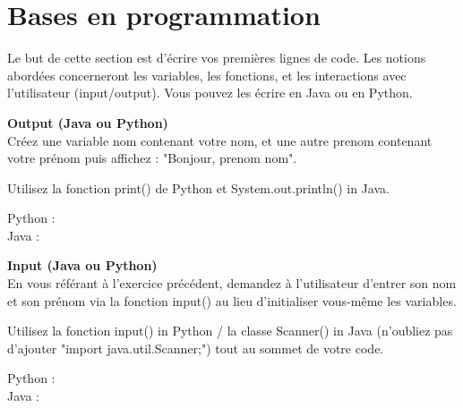 \newpage
\section{Bases en programmation}
Le but de cette section est d'écrire vos premières lignes de code. Les notions abordées concerneront les variables, les fonctions, et les interactions avec l'utilisateur (input/output). Vous pouvez les écrire en Java ou en Python.\\

\begin{Exercice}[20 minutes] \textbf{Output (Java ou Python)}\\
   Créez une variable nom contenant votre nom, et une autre prenom contenant votre prénom puis affichez : "Bonjour, prenom nom". \\
   
    \begin{conseil}
        Utilisez la fonction print() de Python et System.out.println() in Java. 
        
    \end{conseil}
    \begin{solution}
    
    Python : \\
    
    
    
    Java : \\
    
      
       
        
    \end{solution}   
\end{Exercice}

\begin{Exercice}[20 minutes] \textbf{Input (Java ou Python)}\\
   En vous référant à l'exercice précédent, demandez à l'utilisateur d'entrer son nom et son prénom via la fonction input() au lieu d'initialiser vous-même les variables. \\
   
    \begin{conseil}
       Utilisez la fonction input() in Python / la classe Scanner() in Java (n'oubliez pas d'ajouter "import java.util.Scanner;") tout au sommet de votre code. 
        
    \end{conseil}
    \begin{solution}
    
    Python : \\
    
    
    
    Java : \\
    
      
       
        
    \end{solution}   
\end{Exercice}

